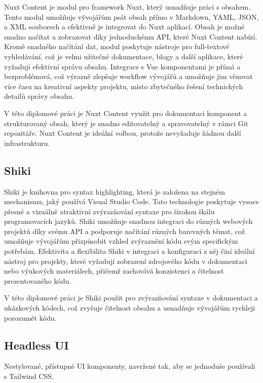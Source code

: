 Nuxt Content je modul pro framework Nuxt, který usnadňuje práci s obsahem. Tento modul umožňuje vývojářům psát obsah přímo v Markdown, YAML, JSON, a XML souborech a efektivně je integrovat do Nuxt aplikací. Obsah je možné snadno načítat a zobrazovat díky jednoduchému API, které Nuxt Content nabízí. Kromě snadného načítání dat, modul poskytuje nástroje pro full-textové vyhledávání, což je velmi užitečné dokumentace, blogy a další aplikace, které vyžadují efektivní správu obsahu. Integrace s Vue komponentami je přímá a bezproblémová, což výrazně zlepšuje workflow vývojářů a umožňuje jim věnovat více času na kreativní aspekty projektu, místo zbytečného řešení technických detailů správy obsahu.

V této diplomové práci je Nuxt Content využit pro dokumentaci komponent a strukturovaný obsah, který je snadno editovatelný a spravovatelný v rámci Git repozitáře. Nuxt Content je ideální volbou, protože nevyžaduje žádnou další infrastrukturu.

\subsection{Shiki}
Shiki je knihovna pro syntax highlighting, která je založena na stejném mechanismu, jaký používá Visual Studio Code. Tato technologie poskytuje vysoce přesné a vizuálně atraktivní zvýrazňování syntaxe pro širokou škálu programovacích jazyků. Shiki umožňuje snadnou integraci do různých webových projektů díky svému API a podporuje načítání různých barevných témat, což umožňuje vývojářům přizpůsobit vzhled zvýraznění kódu svým specifickým potřebám. Efektivita a flexibilita Shiki v integraci a konfiguraci z něj činí ideální nástroj pro projekty, které vyžadují zobrazení zdrojového kódu v dokumentaci nebo výukových materiálech, přičemž zachovává konzistenci a čitelnost prezentovaného kódu. \cite{Shiki}

V této diplomové práci je Shiki použit pro zvýrazňování syntaxe v dokumentaci a ukázkových kódech, což zvyšuje čitelnost obsahu a usnadňuje vývojářům rychleji porozumět kódu.

\subsection{Headless UI}
Nestylované, přístupné UI komponenty, navržené tak, aby se jednoduše používali s Tailwind CSS. \cite{HeadlessUI}

